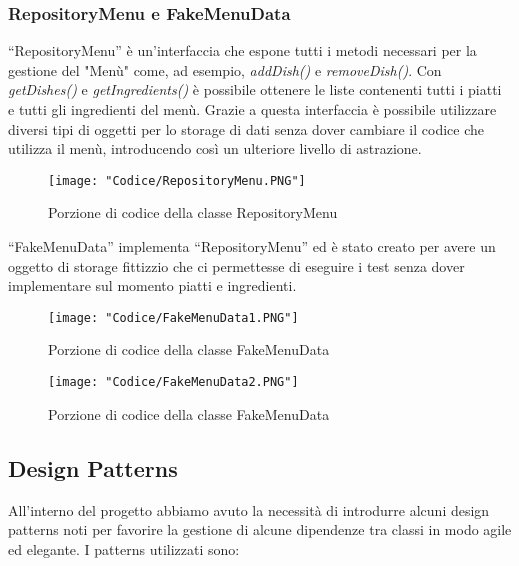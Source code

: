 \documentclass{article}
\begin{document}
\subsubsection{RepositoryMenu e FakeMenuData}

``RepositoryMenu'' \`e un'interfaccia che espone tutti i metodi necessari per la gestione del "Men\`u" come, ad esempio, \textit{addDish()} e \textit{removeDish()}. Con \textit{getDishes()} e \textit{getIngredients()} \`e possibile ottenere le liste contenenti tutti i piatti e tutti gli ingredienti del men\`u. Grazie a questa interfaccia \`e possibile utilizzare diversi tipi di oggetti per lo storage di dati senza dover cambiare il codice che utilizza il men\`u, introducendo cos\`i un ulteriore livello di astrazione.


\begin{figure}[!h]
\centering
\texttt{[image: "Codice/RepositoryMenu.PNG"]}
\caption{Porzione di codice della classe RepositoryMenu}
\end{figure}

\newpage

\noindent ``FakeMenuData'' implementa ``RepositoryMenu'' ed \`e stato creato per avere un oggetto di storage fittizzio che ci permettesse di eseguire i test senza dover implementare sul momento piatti e ingredienti.

\begin{figure}[!h]
\centering
\texttt{[image: "Codice/FakeMenuData1.PNG"]}
\caption{Porzione di codice della classe FakeMenuData}
\end{figure}

\begin{figure}[!h]
\centering
\texttt{[image: "Codice/FakeMenuData2.PNG"]}
\caption{Porzione di codice della classe FakeMenuData}
\end{figure}

\newpage

\subsection{Design Patterns}
\begin{comment}
Nella realizzazione del nostro progetto abbiamo ritenuto opportuno introdurre alcuni design patterns noti, indispensabili alla gestione di criticit\`a emerse durante il lavoro. I patterns utilizzati nel nostro applicativo sono: 
\\\\\\\
Nella realizzazione del nostro progetto ci siamo imbattuti in delle situazioni dove \`e emersa la necessit\`a di introdurre dei design patterns noti al fine di gestirle in modo agile ed elegante. I patterns utilizzati nel nostro applicativo sono:
\\\\\\
\end{comment}
All'interno del progetto abbiamo avuto la necessit\`a di introdurre alcuni design patterns noti per favorire la gestione di alcune dipendenze tra classi in modo agile ed elegante. I patterns utilizzati sono:
\end{document}

